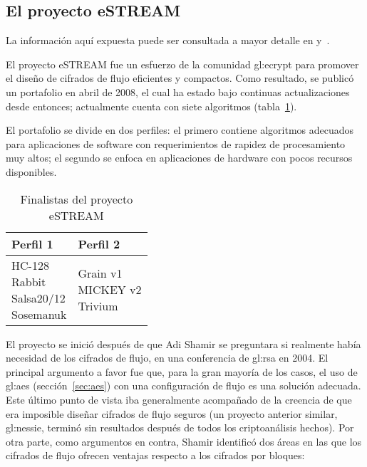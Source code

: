 %
%

\subsection{El proyecto eSTREAM}

La información aquí expuesta puede ser consultada a mayor detalle en
\cite{resultados_estream_1, resultados_estream_2} y~\cite{estream_portafolio}.

El proyecto eSTREAM fue un esfuerzo de la comunidad \gls{gl:ecrypt} para
promover el diseño de cifrados de flujo eficientes y compactos. Como resultado,
se publicó un portafolio en abril de 2008, el cual ha estado bajo continuas
actualizaciones desde entonces; actualmente cuenta con siete algoritmos
(tabla~\ref{portafolio_estream}).

El portafolio se divide en dos perfiles: el primero contiene algoritmos
adecuados para aplicaciones de software con requerimientos de rapidez de
procesamiento muy altos; el segundo se enfoca en aplicaciones de hardware con
pocos recursos disponibles.

\begin{table}
  \centering
  \begin{tabular}{| m{0.85in} | m{0.85in} |}
    \hline
    \textbf{Perfil 1} & \textbf{Perfil 2} \\ [0.5ex]
    \hline
    \makecell{HC-128 \\ Rabbit \\ Salsa20/12 \\ Sosemanuk} &
    \makecell{Grain v1 \\ MICKEY v2 \\ Trivium} \\
    \hline
  \end{tabular}
  \caption{Finalistas del proyecto eSTREAM}
  \label{portafolio_estream}
\end{table}

El proyecto se inició después de que Adi Shamir se preguntara si realmente
había necesidad de los cifrados de flujo, en una conferencia de
\gls{gl:rsa} en 2004. El principal argumento a favor fue que, para la gran
mayoría de los casos, el uso de \gls{gl:aes} (sección~\ref{sec:aes}) con
una configuración de flujo es una solución adecuada. Este último punto de vista
iba generalmente acompañado de la creencia de que era imposible diseñar cifrados
de flujo seguros (un proyecto anterior similar, \gls{gl:nessie}, terminó
sin resultados después de todos los criptoanálisis hechos). Por otra parte,
como argumentos en contra, Shamir identificó dos áreas en las que los cifrados
de flujo ofrecen ventajas respecto a los cifrados por bloques:

